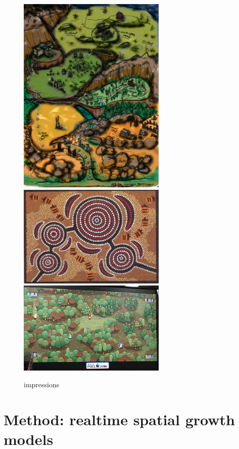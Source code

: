 \documentclass{article}
\begin{document}
\begin{figure}
\centering
  \begin{center}
	\includegraphics[width=200pt]{images/map_design.jpg}
	\includegraphics[width=200pt]{images/aboriginal_art.jpg}
	\includegraphics[width=200pt]{images/forest.jpg}
\end{center}
	\caption{impressions}\label{fig:global_map}
\end{figure}


\section{Method: realtime spatial growth models}
\end{document}
